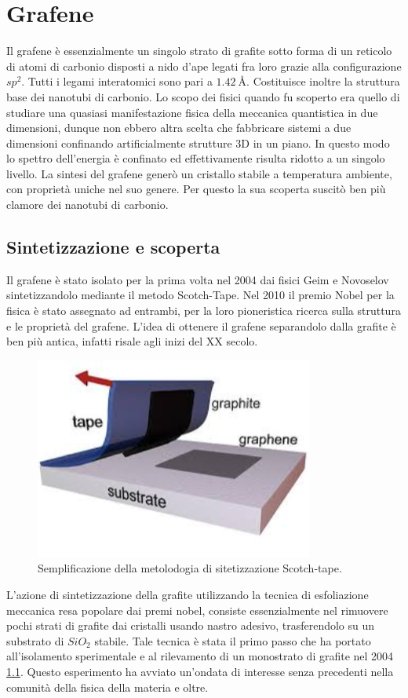 \documentclass[a4paper,titlepage]{book}
\begin{document}
\chapter{Grafene}
Il grafene è essenzialmente un singolo strato di grafite sotto forma di un reticolo di atomi di carbonio disposti a nido d'ape legati fra loro grazie alla configurazione $sp^2$. Tutti i legami interatomici sono pari a $\SI{1,42}{\angstrom}$. 
Costituisce inoltre la struttura base dei nanotubi di carbonio. Lo scopo dei fisici quando fu scoperto era quello di studiare una quasiasi manifestazione fisica della meccanica quantistica in due dimensioni, dunque non ebbero altra scelta che fabbricare sistemi a due dimensioni confinando artificialmente strutture 3D in un piano. In questo modo lo spettro dell'energia è confinato ed effettivamente risulta ridotto a un singolo livello. La sintesi del grafene generò un cristallo stabile a temperatura ambiente, con proprietà uniche nel suo genere. Per questo la sua scoperta suscitò ben più clamore dei nanotubi di carbonio.

\section{Sintetizzazione e scoperta}
Il grafene è stato isolato per la prima volta nel 2004 dai fisici Geim e Novoselov sintetizzandolo mediante il metodo Scotch-Tape. Nel 2010 il premio Nobel per la fisica è stato assegnato ad entrambi, per la loro pioneristica ricerca sulla struttura e le proprietà del grafene. L'idea di ottenere il grafene separandolo dalla grafite è ben più antica, infatti risale agli inizi del XX secolo.
\begin{figure}[h!] 
	\centering
	\includegraphics[width=0.6\columnwidth]{scotchtape.png}
	\caption{ 	\label{tape}
		Semplificazione della metolodogia di sitetizzazione Scotch-tape.
	}
\end{figure}
L'azione di sintetizzazione della grafite utilizzando la tecnica di esfoliazione meccanica resa popolare dai premi nobel, consiste essenzialmente nel rimuovere pochi strati di grafite dai cristalli usando nastro adesivo, trasferendolo su un substrato di $SiO_2$ stabile. Tale tecnica è stata il primo passo che ha portato all'isolamento sperimentale e al rilevamento di un monostrato di grafite nel 2004 \ref{tape}. Questo esperimento ha avviato un'ondata di interesse senza precedenti nella comunità della fisica della materia e oltre. \\
\end{document}
